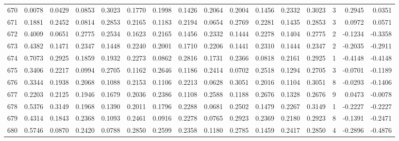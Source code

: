 \begin{tabular}{lrrrrrrrrrrrrrrr}
670 &      0.0078 &  0.0429 &  0.0853 &  0.3023 &  0.1770 &  0.1998 &  0.1426 &  0.2064 &  0.2004 &  0.1456 &   0.2332 &     0.3023 &      3 &                    0.2945 &                     0.0351 \\
671 &      0.1881 &  0.2452 &  0.0814 &  0.2853 &  0.2165 &  0.1183 &  0.2194 &  0.0654 &  0.2769 &  0.2281 &   0.1435 &     0.2853 &      3 &                    0.0972 &                     0.0571 \\
672 &      0.4009 &  0.0651 &  0.2775 &  0.2534 &  0.1623 &  0.2165 &  0.1456 &  0.2332 &  0.1444 &  0.2278 &   0.1404 &     0.2775 &      2 &                   -0.1234 &                    -0.3358 \\
673 &      0.4382 &  0.1471 &  0.2347 &  0.1448 &  0.2240 &  0.2001 &  0.1710 &  0.2206 &  0.1441 &  0.2310 &   0.1444 &     0.2347 &      2 &                   -0.2035 &                    -0.2911 \\
674 &      0.7073 &  0.2925 &  0.1859 &  0.1932 &  0.2273 &  0.0862 &  0.2816 &  0.1731 &  0.2366 &  0.0818 &   0.2161 &     0.2925 &      1 &                   -0.4148 &                    -0.4148 \\
675 &      0.3406 &  0.2217 &  0.0994 &  0.2705 &  0.1162 &  0.2646 &  0.1186 &  0.2414 &  0.0702 &  0.2518 &   0.1294 &     0.2705 &      3 &                   -0.0701 &                    -0.1189 \\
676 &      0.3344 &  0.1938 &  0.2068 &  0.1088 &  0.2153 &  0.1106 &  0.2213 &  0.0628 &  0.3051 &  0.2016 &   0.1104 &     0.3051 &      8 &                   -0.0293 &                    -0.1406 \\
677 &      0.2203 &  0.2125 &  0.1946 &  0.1679 &  0.2036 &  0.2386 &  0.1108 &  0.2588 &  0.1188 &  0.2676 &   0.1328 &     0.2676 &      9 &                    0.0473 &                    -0.0078 \\
678 &      0.5376 &  0.3149 &  0.1968 &  0.1390 &  0.2011 &  0.1796 &  0.2288 &  0.0681 &  0.2502 &  0.1479 &   0.2267 &     0.3149 &      1 &                   -0.2227 &                    -0.2227 \\
679 &      0.4314 &  0.1843 &  0.2368 &  0.1093 &  0.2461 &  0.0916 &  0.2278 &  0.0765 &  0.2923 &  0.2369 &   0.2180 &     0.2923 &      8 &                   -0.1391 &                    -0.2471 \\
680 &      0.5746 &  0.0870 &  0.2420 &  0.0788 &  0.2850 &  0.2599 &  0.2358 &  0.1180 &  0.2785 &  0.1459 &   0.2417 &     0.2850 &      4 &                   -0.2896 &                    -0.4876 \\

\end{tabular}
